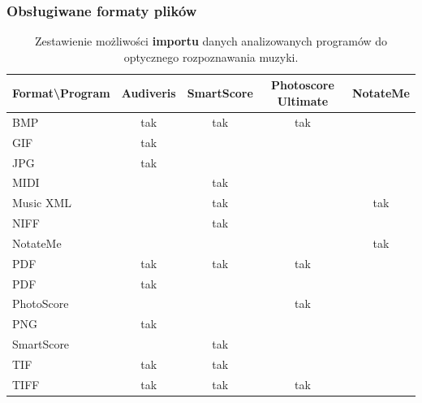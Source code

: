 \documentclass[polish,thesis,12pt]{dcsbook}
\begin{document}
\subsubsection{Obsługiwane formaty plików}
\begin{center}
\begin{longtable}{|l|c|c|c|c|}
\caption{Zestawienie możliwości \textbf{importu} danych analizowanych programów do optycznego rozpoznawania muzyki.} \label{omr-import} \\
\hline
\multicolumn{1}{|c|}{\textbf{Format{\textbackslash}Program}} & Audiveris & SmartScore & Photoscore Ultimate & NotateMe \\ \hline
BMP                                           & tak       & tak        & tak                 &          \\ \hline
GIF                                           & tak       &            &                     &          \\ \hline
JPG                                           & tak       &            &                     &          \\ \hline
MIDI                                          &           & tak        &                     &          \\ \hline
Music XML                                     &           & tak        &                     & tak      \\ \hline
NIFF                                          &           & tak        &                     &          \\ \hline
NotateMe                                      &           &            &                     & tak      \\ \hline
PDF                                           & tak       & tak        & tak                 &          \\ \hline
PDF                                           & tak       &            &                     &          \\ \hline
PhotoScore                                    &           &            & tak                 &          \\ \hline
PNG                                           & tak       &            &                     &          \\ \hline
SmartScore                                    &           & tak        &                     &          \\ \hline
TIF                                           & tak       & tak        &                     &          \\ \hline
TIFF                                          & tak       & tak        & tak                 &          \\ \hline
\end{longtable}
\end{center}
\end{document}
